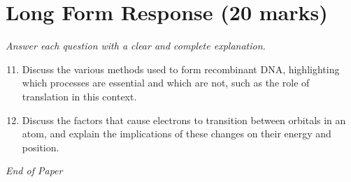 \documentclass[12pt]{article}
\begin{document}
\section*{Long Form Response (20 marks)}
\textit{Answer each question with a clear and complete explanation.}
\begin{enumerate}[label=\arabic*.]
\setcounter{enumi}{10}
\item Discuss the various methods used to form recombinant DNA, highlighting which processes are essential and which are not, such as the role of translation in this context.
\item Discuss the factors that cause electrons to transition between orbitals in an atom, and explain the implications of these changes on their energy and position.
\end{enumerate}

\vfill
\noindent\textit{End of Paper}
\end{document}
